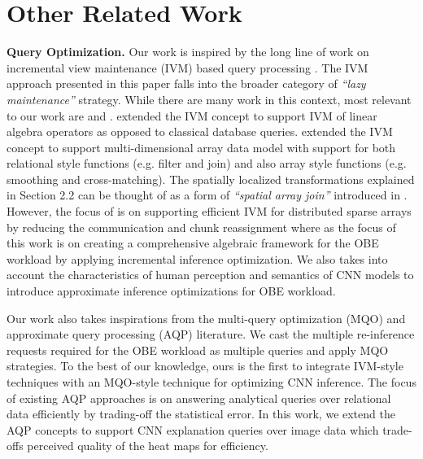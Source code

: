 \documentclass[10pt, sigconf]{acmart}
\begin{document}


\section{Other Related Work}

\vspace{2mm}
\noindent \textbf{Query Optimization.} Our work is inspired by the long line of work on incremental view maintenance (IVM) based query processing \cite{chirkova2012materialized,gupta1995maintenance,levy1995answering}.
The IVM approach presented in this paper falls into the broader category of \textit{``lazy maintenance''} strategy.
While there are many work in this context, most relevant to our work are \cite{nikolic2014linview} and \cite{zhao2017incremental}.
\cite{nikolic2014linview} extended the IVM concept to support IVM of linear algebra operators as opposed to classical database queries.
\cite{zhao2017incremental} extended the IVM concept to support multi-dimensional array data model with support for both relational style functions (e.g. filter and join) and also array style functions (e.g. smoothing and cross-matching).
The spatially localized transformations explained in Section 2.2 can be thought of as a form of \textit{``spatial array join''} introduced in \cite{zhao2017incremental}.
However, the focus of \cite{zhao2017incremental} is on supporting efficient IVM for distributed sparse arrays by reducing the communication and chunk reassignment where as the focus of this work is on creating a comprehensive algebraic framework for the OBE workload by applying incremental inference optimization.
We also takes into account the characteristics of human perception and semantics of CNN models to introduce approximate inference optimizations for OBE workload.

Our work also takes inspirations from the multi-query optimization (MQO) \cite{sellis1988multiple,le2012scalable} and approximate query processing (AQP) \cite{park2018verdictdb,garofalakis2001approximate} literature.
We cast the multiple re-inference requests required for the OBE workload as multiple queries and apply MQO strategies.
To the best of our knowledge, ours is the first to integrate IVM-style techniques with an MQO-style technique for optimizing CNN inference.
The focus of existing AQP approaches is on answering analytical queries over relational data efficiently by trading-off the statistical error.
In this work, we extend the AQP concepts to support CNN explanation queries over image data which trade-offs perceived quality of the heat maps for efficiency.
\end{document}
